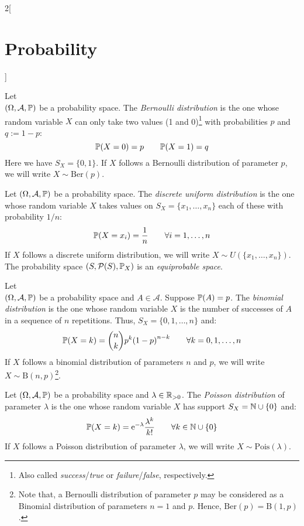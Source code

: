 \documentclass[../../../main_math.tex]{subfiles}
\begin{document}
\begin{multicols}{2}[\section{Probability}]
\begin{definition}
  \end{definition}
  \begin{definition}
    Let\\ $(\Omega,\mathcal{A},\mathbb{P})$ be a probability space. The \emph{Bernoulli distribution} is the one whose random variable $X$ can only take two values (1 and 0)\footnote{Also called \emph{success}/\emph{true} or \emph{failure}/\emph{false}, respectively.} with probabilities $p$ and $q:=1-p$: $$\mathbb{P}(X=0)=p\qquad \mathbb{P}(X=1)=q$$ Here we have $S_X=\{0,1\}$. If $X$ follows a Bernoulli distribution of parameter $p$, we will write $X\sim \text{Ber}(p)$.
  \end{definition}
  \begin{definition}
    Let $(\Omega,\mathcal{A},\mathbb{P})$ be a probability space. The \emph{discrete uniform distribution} is the one whose random variable $X$ takes values on $S_X=\{x_1,\ldots,x_n\}$ each of these with probability $1/n$: $$\mathbb{P}(X=x_i)=\frac{1}{n}\qquad \forall i=1,\ldots,n$$ If $X$ follows a discrete uniform distribution, we will write $X\sim U(\{x_1,\ldots,x_n\})$. The probability space $(S,\mathcal{P}(S),\mathbb{P}_X)$ is an \emph{equiprobable space}.
  \end{definition}
  \begin{definition}
    Let\\ $(\Omega,\mathcal{A},\mathbb{P})$ be a probability space and $A\in\mathcal{A}$. Suppose $\mathbb{P}(A)=p$. The \emph{binomial distribution} is the one whose random variable $X$ is the number of successes of $A$ in a sequence of $n$ repetitions. Thus, $S_X=\{0,1,\ldots,n\}$ and: $$\mathbb{P}(X=k)=\binom{n}{k}p^k{(1-p)}^{n-k}\qquad \forall k=0,1,\ldots,n$$ If $X$ follows a binomial distribution of parameters $n$ and $p$, we will write $X\sim \text{B}(n,p)$\footnote{Note that, a Bernoulli distribution of parameter $p$ may be considered as a Binomial distribution of parameters $n=1$ and $p$. Hence, $\text{Ber}(p)=\text{B}(1,p)$.}.
  \end{definition}
  \begin{definition}
    Let $(\Omega,\mathcal{A},\mathbb{P})$ be a probability space and $\lambda\in\mathbb{R}_{>0}$. The \emph{Poisson distribution} of parameter $\lambda$ is the one whose random variable $X$ has support $S_X=\mathbb{N}\cup\{0\}$ and: $$\mathbb{P}(X=k)=\mathrm{e}^{-\lambda}\frac{\lambda^k}{k!}\qquad \forall k\in\mathbb{N}\cup\{0\}$$ If $X$ follows a Poisson distribution of parameter $\lambda$, we will write $X\sim \text{Pois}(\lambda)$.

\end{definition}
\end{multicols}
\end{document}
